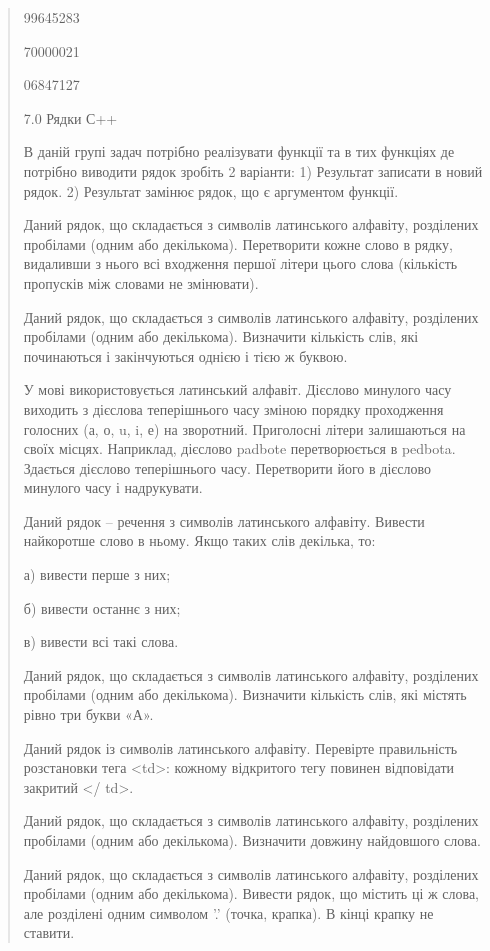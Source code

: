 \documentclass[]{article}
\begin{document}
\begin{quote}
99645283

70000021

06847127

7.0 Рядки С++

\protect\hypertarget{_Hlk65949005}{}{}В даній групі задач потрібно
реалізувати функції та в тих функціях де потрібно виводити рядок зробіть
2 варіанти: 1) Результат записати в новий рядок. 2) Результат замінює
рядок, що є аргументом функції.

Даний рядок, що складається з символів латинського алфавіту, розділених
пробілами (одним або декількома). Перетворити кожне слово в рядку,
видаливши з нього всі входження першої літери цього слова (кількість
пропусків між словами не змінювати).

Даний рядок, що складається з символів латинського алфавіту, розділених
пробілами (одним або декількома). Визначити кількість слів, які
починаються і закінчуються однією і тією ж буквою.

У мові використовується латинський алфавіт. Дієслово минулого часу
виходить з дієслова теперішнього часу зміною порядку проходження
голосних (а, о, u, i, е) на зворотний. Приголосні літери залишаються на
своїх місцях. Наприклад, дієслово padbote перетворюється в pedbota.
Здається дієслово теперішнього часу. Перетворити його в дієслово
минулого часу і надрукувати.

Даний рядок -- речення з символів латинського алфавіту. Вивести
найкоротше слово в ньому. Якщо таких слів декілька, то:

а) вивести перше з них;

б) вивести останнє з них;

в) вивести всі такі слова.

Даний рядок, що складається з символів латинського алфавіту, розділених
пробілами (одним або декількома). Визначити кількість слів, які містять
рівно три букви «А».

\protect\hypertarget{_Hlk65949143}{}{}Даний рядок із символів
латинського алфавіту. Перевірте правильність розстановки тега
\textless{}td\textgreater{}: кожному відкритого тегу повинен відповідати
закритий \textless{}/ td\textgreater{}.

Даний рядок, що складається з символів латинського алфавіту, розділених
пробілами (одним або декількома). Визначити довжину найдовшого слова.

\protect\hypertarget{_Hlk65949382}{}{}Даний рядок, що складається з
символів латинського алфавіту, розділених пробілами (одним або
декількома). Вивести рядок, що містить ці ж слова, але розділені одним
символом '.' (точка, крапка). В кінці крапку не ставити.


\end{quote}
\end{document}
